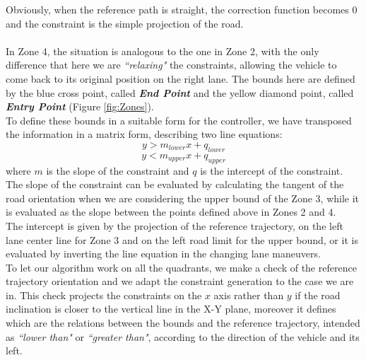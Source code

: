 Obviously, when the reference path is straight, the correction function becomes 0 and the constraint is the simple projection of the road.\\\\
In Zone 4, the situation is analogous to the one in Zone 2, with the only difference that here we are \textit{``relaxing"} the constraints, allowing the vehicle to come back to its original position on the right lane. The bounds here are defined by the blue cross point, called \textbf{\textit{End Point}} and the yellow diamond point, called \textbf{\textit{Entry Point}} (Figure \ref{fig:Zones}).\\
To define these bounds in a suitable form for the controller, we have transposed the information in a matrix form, describing two line equations:
\begin{equation}
    y > m_{lower}x + q_{lower}
\end{equation}
\begin{equation}
    y < m_{upper}x + q_{upper}
\end{equation}
where $m$ is the slope of the constraint and $q$ is the intercept of the constraint.
The slope of the constraint can be evaluated by calculating the tangent of the road orientation when we are considering the upper bound of the Zone 3, while it is evaluated as the slope between the points defined above in Zones 2 and 4.\\
The intercept is given by the projection of the reference trajectory, on the left lane center line for Zone 3 and on the left road limit for the upper bound, or it is evaluated by inverting the line equation in the changing lane maneuvers.\\
To let our algorithm work on all the quadrants, we make a check of the reference trajectory orientation and we adapt the constraint generation to the case we are in. This check projects the constraints on the $x$ axis rather than $y$ if the road inclination is closer to the vertical line in the X-Y plane, moreover it defines which are the relations between the bounds and the reference trajectory, intended as \textit{``lower than"} or \textit{``greater than"}, according to the direction of the vehicle and its left.
